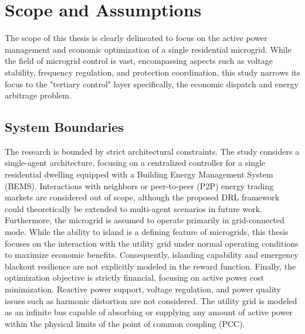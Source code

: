 
\section{Scope and Assumptions}

The scope of this thesis is clearly delineated to focus on the active power management and economic optimization of a single residential microgrid. While the field of microgrid control is vast, encompassing aspects such as voltage stability, frequency regulation, and protection coordination, this study narrows its focus to the "tertiary control" layer specifically, the economic dispatch and energy arbitrage problem.

\subsection{System Boundaries}
The research is bounded by strict architectural constraints. The study considers a single-agent architecture, focusing on a centralized controller for a single residential dwelling equipped with a Building Energy Management System (BEMS). Interactions with neighbors or peer-to-peer (P2P) energy trading markets are considered out of scope, although the proposed DRL framework could theoretically be extended to multi-agent scenarios in future work. Furthermore, the microgrid is assumed to operate primarily in grid-connected mode. While the ability to island is a defining feature of microgrids, this thesis focuses on the interaction with the utility grid under normal operating conditions to maximize economic benefits. Consequently, islanding capability and emergency blackout resilience are not explicitly modeled in the reward function. Finally, the optimization objective is strictly financial, focusing on active power cost minimization. Reactive power support, voltage regulation, and power quality issues such as harmonic distortion are not considered. The utility grid is modeled as an infinite bus capable of absorbing or supplying any amount of active power within the physical limits of the point of common coupling (PCC).

